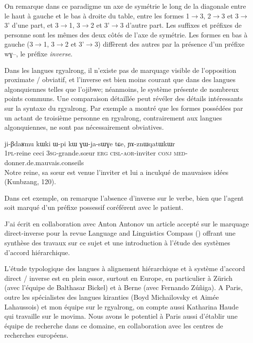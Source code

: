 \documentclass[oldfontcommands,oneside,a4paper,11pt]{memoir}
\newcommand{\ipa}[1]{{\phon #1}} %
\newcommand{\aor}{\textsc{aor}}
\newcommand{\cisl}{\textsc{cisl}}
\newcommand{\conj}{\textsc{conj}}
\newcommand{\erg}{\textsc{erg}}
\newcommand{\med}{\textsc{med}}
\newcommand{\pl}{\textsc{pl}}
\newcommand{\sg}{\textsc{sg}}
\begin{document}
On remarque dans ce paradigme un axe de symétrie le long de la diagonale entre le haut à gauche et le bas à droite du table, entre les formes 1$\rightarrow$3, 2$\rightarrow$3 et 3$\rightarrow$3' d'une part, et 3$\rightarrow$1, 3$\rightarrow$2 et 3'$\rightarrow$3 d'autre part. 
Les suffixes et préfixes de personne sont les mêmes des deux côtés de l'axe de symétrie. Les formes en bas à gauche (3$\rightarrow$1, 3$\rightarrow$2 et 3'$\rightarrow$3) diffèrent des autres par la présence d'un préfixe \ipa{wɣ--}, le préfixe \textit{inverse}. 

Dans les langues rgyalrong, il n'existe pas de marquage visible de l'opposition proximate / obviatif, et l'inverse est bien moins courant que dans des langues algonquiennes telles que l'ojibwe; néanmoins, le système présente de nombreux points communs. Une comparaison détaillée peut révéler des détails intéressants sur la syntaxe du rgyalrong. Par exemple \citet{jacques10inverse} a montré que les formes possédées par un actant de troisième personne en rgyalrong, contrairement aux langues algonquiennes, ne sont pas nécessairement obviatives.
\begin{exe} 
 \ex 
\gll ji-βdaʁmu	kɯki	ɯ-pi	kɯ	ɣɯ-ja-sɯɣe	tɕe,	ɲɤ-znɯqatɯkɯr \\
	1\pl{}-reine ceci 3\sg{}-grande.sœur \erg{} \cisl{}-\aor{}-inviter \conj{} \med{}-donner.de.mauvais.conseils \\
	\glt Notre reine, sa sœur est venue l'inviter et lui a inculqué de mauvaises idées (Kunbzang, 120).
\end{exe}
Dans cet exemple, on remarque l'absence d'inverse sur le verbe, bien que l'agent soit marqué d'un préfixe possessif coréférent avec le patient. 

J'ai écrit en collaboration avec Anton Antonov un article accepté sur le marquage direct-inverse pour la revue Language and Linguistics Compass (\citealt{jacques14inverse}) offrant une synthèse des travaux sur ce sujet et une introduction à l'étude des systèmes d'accord hiérarchique.

L'étude typologique des langues à alignement hiérarchique et à système d'accord direct / inverse est en plein essor, surtout en Europe, en particulier à Zürich (avec l'équipe de Balthasar Bickel) et à Berne (avec Fernando Zúñiga). A Paris, outre les spécialistes des langues kiranties (Boyd Michailovsky et Aimée Lahaussois) et mon équipe sur le rgyalrong, on compte aussi Katharina Haude qui travaille sur le movima. Nous avons le potentiel à Paris aussi d'établir une équipe de recherche dans ce domaine, en collaboration avec les centres de recherches   européens.
\end{document}
